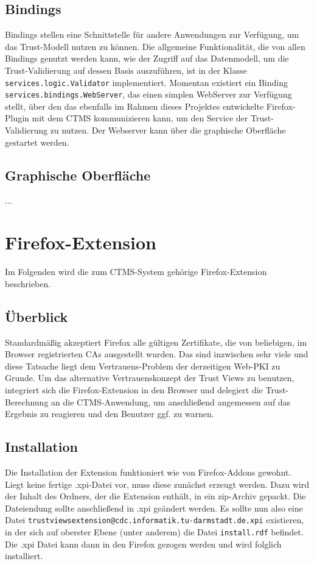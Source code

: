 \documentclass[accentcolor=tud1c,article,colorback,11pt]{tudreport}
\begin{document}
\subsection{Bindings}
Bindings stellen eine Schnittstelle für andere Anwendungen zur Verfügung, um das Trust-Modell nutzen zu können. Die allgemeine Funktionalität, die von allen Bindings genutzt werden kann, wie der Zugriff auf das Datenmodell, um die Trust-Validierung auf dessen Basis auszuführen, ist in der Klasse \texttt{services.logic.Validator} implementiert. Momentan existiert ein Binding \texttt{services.bindings.Web\-Server}, das einen simplen WebServer zur Verfügung stellt, über den das ebenfalls im Rahmen dieses Projektes entwickelte Firefox-Plugin mit dem CTMS kommunizieren kann, um den Service der Trust-Validierung zu nutzen. Der Webserver kann über die graphische Oberfläche gestartet werden.

\subsection{Graphische Oberfläche}
...

\section{Firefox-Extension}
Im Folgenden wird die zum CTMS-System gehörige Firefox-Extension beschrieben.

\subsection{Überblick}
Standardmäßig akzeptiert Firefox alle gültigen Zertifikate, die von beliebigen, im Browser registrierten CAs ausgestellt wurden. Das sind inzwischen sehr viele und diese Tatsache liegt dem Vertrauens-Problem der derzeitigen Web-PKI zu Grunde. Um das alternative Vertrauenskonzept der Trust Views zu benutzen, integriert sich die Firefox-Extension in den Browser und delegiert die Trust-Berechnung an die CTMS-Anwendung, um anschließend angemessen auf das Ergebnis zu reagieren und den Benutzer ggf. zu warnen.

\subsection{Installation}
Die Installation der Extension funktioniert wie von Firefox-Addons gewohnt. Liegt keine fertige .xpi-Datei vor, muss diese zunächst erzeugt werden. Dazu wird der Inhalt des Ordners, der die Extension enthält, in ein zip-Archiv gepackt. Die Dateiendung sollte anschließend in .xpi geändert werden. Es sollte nun also eine Datei \texttt{trustviewsextension@cdc.informatik.tu-darmstadt.de.xpi} existieren, in der sich auf oberster Ebene (unter anderem) die Datei \texttt{install.rdf} befindet. Die .xpi Datei kann dann in den Firefox gezogen werden und wird folglich installiert.
\end{document}
